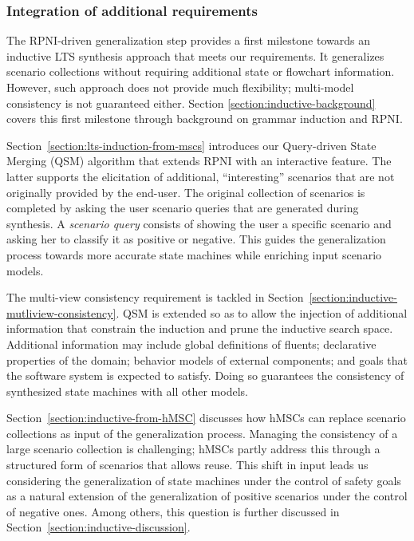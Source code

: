 \subsubsection*{Integration of additional requirements}

The RPNI-driven generalization step provides a first milestone towards an inductive LTS synthesis approach that meets our requirements. It generalizes scenario collections without requiring additional state or flowchart information. However, such approach does not provide much flexibility; multi-model consistency is not guaranteed either. Section \ref{section:inductive-background} covers this first milestone through background on grammar induction and RPNI.

Section~\ref{section:lts-induction-from-mscs} introduces our Query-driven State Merging (QSM) algorithm that extends RPNI with an interactive feature. The latter supports the elicitation of additional, ``interesting'' scenarios that are not originally provided by the end-user. The original collection of scenarios is completed by asking the user scenario queries that are generated during synthesis. A \emph{scenario query} consists of showing the user a specific scenario and asking her to classify it as positive or negative. This guides the generalization process towards more accurate state machines while enriching input scenario models.

The multi-view consistency requirement is tackled in Section~\ref{section:inductive-mutliview-consistency}. QSM is extended so as to allow the injection of additional information that constrain the induction and prune the inductive search space. Additional information may include global definitions of fluents; declarative properties of the domain; behavior models of external components; and goals that the software system is expected to satisfy. Doing so guarantees the consistency of synthesized state machines with all other models.

Section~\ref{section:inductive-from-hMSC} discusses how hMSCs can replace scenario collections as input of the generalization process. Managing the consistency of a large scenario collection is challenging; hMSCs partly address this through a structured form of scenarios that allows reuse. This  shift in input leads us considering the generalization of state machines under the control of safety goals as a natural extension of the generalization of positive scenarios under the control of negative ones. Among others, this question is further discussed in Section~\ref{section:inductive-discussion}.

